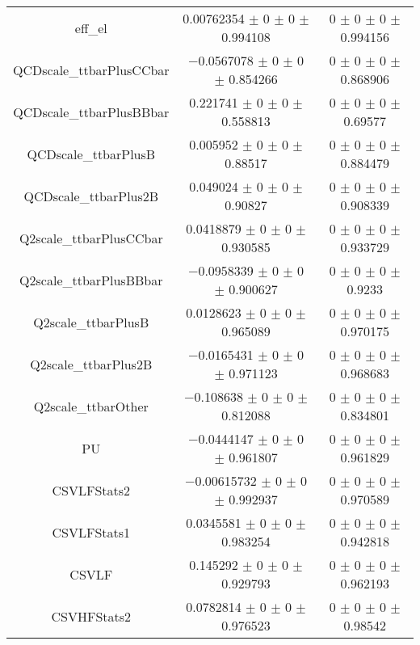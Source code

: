 \begin{table}
\begin{tabular}{ccc}
eff\_el & \num{0.00762354} $\pm$ \num{0} $\pm$ \num{0} $\pm$ \num{0.994108} & \num{0} $\pm$ \num{0} $\pm$ \num{0} $\pm$ \num{0.994156}\\
QCDscale\_ttbarPlusCCbar & \num{-0.0567078} $\pm$ \num{0} $\pm$ \num{0} $\pm$ \num{0.854266} & \num{0} $\pm$ \num{0} $\pm$ \num{0} $\pm$ \num{0.868906}\\
QCDscale\_ttbarPlusBBbar & \num{0.221741} $\pm$ \num{0} $\pm$ \num{0} $\pm$ \num{0.558813} & \num{0} $\pm$ \num{0} $\pm$ \num{0} $\pm$ \num{0.69577}\\
QCDscale\_ttbarPlusB & \num{0.005952} $\pm$ \num{0} $\pm$ \num{0} $\pm$ \num{0.88517} & \num{0} $\pm$ \num{0} $\pm$ \num{0} $\pm$ \num{0.884479}\\
QCDscale\_ttbarPlus2B & \num{0.049024} $\pm$ \num{0} $\pm$ \num{0} $\pm$ \num{0.90827} & \num{0} $\pm$ \num{0} $\pm$ \num{0} $\pm$ \num{0.908339}\\
Q2scale\_ttbarPlusCCbar & \num{0.0418879} $\pm$ \num{0} $\pm$ \num{0} $\pm$ \num{0.930585} & \num{0} $\pm$ \num{0} $\pm$ \num{0} $\pm$ \num{0.933729}\\
Q2scale\_ttbarPlusBBbar & \num{-0.0958339} $\pm$ \num{0} $\pm$ \num{0} $\pm$ \num{0.900627} & \num{0} $\pm$ \num{0} $\pm$ \num{0} $\pm$ \num{0.9233}\\
Q2scale\_ttbarPlusB & \num{0.0128623} $\pm$ \num{0} $\pm$ \num{0} $\pm$ \num{0.965089} & \num{0} $\pm$ \num{0} $\pm$ \num{0} $\pm$ \num{0.970175}\\
Q2scale\_ttbarPlus2B & \num{-0.0165431} $\pm$ \num{0} $\pm$ \num{0} $\pm$ \num{0.971123} & \num{0} $\pm$ \num{0} $\pm$ \num{0} $\pm$ \num{0.968683}\\
Q2scale\_ttbarOther & \num{-0.108638} $\pm$ \num{0} $\pm$ \num{0} $\pm$ \num{0.812088} & \num{0} $\pm$ \num{0} $\pm$ \num{0} $\pm$ \num{0.834801}\\
PU & \num{-0.0444147} $\pm$ \num{0} $\pm$ \num{0} $\pm$ \num{0.961807} & \num{0} $\pm$ \num{0} $\pm$ \num{0} $\pm$ \num{0.961829}\\
CSVLFStats2 & \num{-0.00615732} $\pm$ \num{0} $\pm$ \num{0} $\pm$ \num{0.992937} & \num{0} $\pm$ \num{0} $\pm$ \num{0} $\pm$ \num{0.970589}\\
CSVLFStats1 & \num{0.0345581} $\pm$ \num{0} $\pm$ \num{0} $\pm$ \num{0.983254} & \num{0} $\pm$ \num{0} $\pm$ \num{0} $\pm$ \num{0.942818}\\
CSVLF & \num{0.145292} $\pm$ \num{0} $\pm$ \num{0} $\pm$ \num{0.929793} & \num{0} $\pm$ \num{0} $\pm$ \num{0} $\pm$ \num{0.962193}\\
CSVHFStats2 & \num{0.0782814} $\pm$ \num{0} $\pm$ \num{0} $\pm$ \num{0.976523} & \num{0} $\pm$ \num{0} $\pm$ \num{0} $\pm$ \num{0.98542}\\

\end{tabular}
\end{table}
